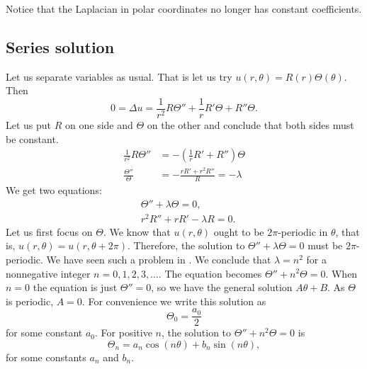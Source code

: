 \documentclass{ximera}
\begin{document}
Notice that the Laplacian in polar coordinates no longer has constant coefficients.

\subsection{Series solution}

Let us separate variables as usual.  That is let us try $u(r,\theta) = R(r)\Theta(\theta)$.  Then
\begin{equation*}
    0 = \Delta u = \frac{1}{r^2} R \Theta'' + \frac{1}{r} R' \Theta + R'' \Theta .
\end{equation*}
Let us put $R$ on one side and $\Theta$ on the other and conclude that both sides must be constant.
\begin{align*}
    \frac{1}{r^2} R \Theta'' & = - \left(\frac{1}{r} R' + R''\right) \Theta \\
    \frac{\Theta''}{\Theta} & = - \frac{r R' + r^2 R''}{R} = -\lambda
\end{align*}
We get two equations:
\begin{align*}
    & \Theta'' + \lambda \Theta = 0 , \\
    & r^2 R'' + r R' -\lambda R = 0.
\end{align*}
Let us first focus on $\Theta$.  We know that $u(r,\theta)$ ought to be $2\pi$-periodic in $\theta$, that is, $u(r,\theta) = u(r,\theta+2\pi)$.  Therefore, the solution to $\Theta'' + \lambda \Theta = 0$ must be $2\pi$-periodic. We have seen such a problem in . We conclude that
$\lambda = n^2$ for a nonnegative integer $n=0,1,2,3,\ldots$.  The equation becomes $\Theta'' + n^2 \Theta = 0$.  When $n=0$ the equation is just $\Theta'' = 0$, so we have the general solution $A \theta + B$.  As $\Theta$ is periodic, $A=0$. For convenience we write this solution as
\begin{equation*}
    \Theta_0 = \frac{a_0}{2}
\end{equation*}
for some constant $a_0$.  For positive $n$, the solution to $\Theta'' + n^2 \Theta = 0$ is
\begin{equation*}
    \Theta_n = a_n \cos(n\theta) + b_n \sin(n\theta) ,
\end{equation*}
for some constants $a_n$ and $b_n$.
\end{document}
